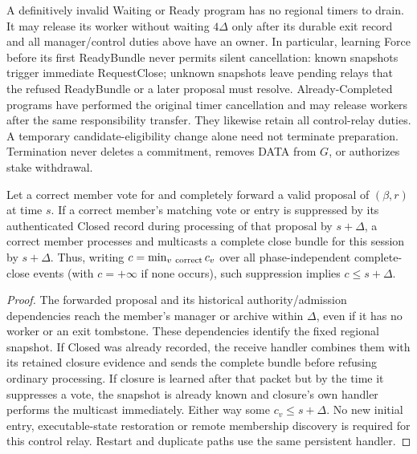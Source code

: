 A definitively invalid Waiting or Ready program has no regional timers
to drain. It may release its worker without waiting $4\Delta$ only after
its durable exit record and all manager/control duties above have an
owner. In particular, learning Force before its first ReadyBundle never
permits silent cancellation: known snapshots trigger immediate
RequestClose; unknown snapshots leave pending relays that the refused
ReadyBundle or a later proposal must resolve. Already-Completed programs
have performed the original timer cancellation and may release workers
after the same responsibility transfer. They likewise retain all
control-relay duties. A temporary candidate-eligibility change alone
need not terminate preparation. Termination never deletes a commitment,
removes DATA from $G$, or authorizes stake withdrawal.

\begin{proposition}
\label{prop:retirement-observable-close}
Let a correct member vote for and completely forward a valid proposal
of $(\beta,r)$ at time $s$. If a correct member's matching vote or entry
is suppressed by its authenticated Closed record during processing of
that proposal by $s+\Delta$, a correct member processes and multicasts
a complete close bundle for this session by $s+\Delta$. Thus, writing
$c=\min_{v\ {\rm correct}}c_v$ over all phase-independent complete-close
events (with $c=+\infty$ if none occurs), such suppression implies
$c\le s+\Delta$.
\end{proposition}
\begin{proof}
The forwarded proposal and its historical authority/admission dependencies
reach the member's manager or archive within $\Delta$, even if it has
no worker or an exit tombstone. These dependencies identify the fixed
regional snapshot. If Closed was already recorded, the receive handler
combines them with its retained closure evidence and sends the complete
bundle before refusing ordinary processing. If closure is learned after
that packet but by the time it suppresses a vote, the snapshot is already
known and closure's own handler performs the multicast immediately.
Either way some $c_v\le s+\Delta$. No new initial entry, executable-state
restoration or remote membership discovery is required for this control
relay. Restart and duplicate paths use the same persistent handler.
\end{proof}

